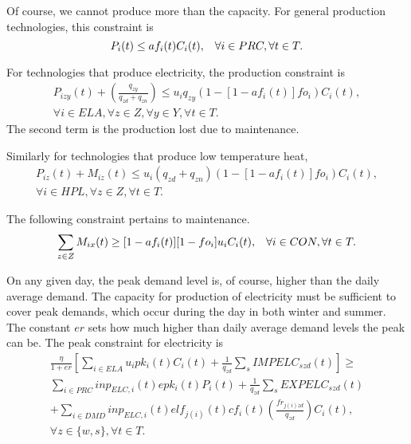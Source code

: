 Of course, we cannot produce more than the capacity.  For general production technologies, this constraint is
\begin{equation*}
P_i(t) \leq af_i(t)C_i(t), \hspace{3mm} \forall i \in PRC, \forall t \in T.
\end{equation*}

For technologies that produce electricity, the production constraint is
\begin{multline*}
P_{izy}(t) + \left(\frac{q_{zy}}{q_{zd} + q_{zn}}\right) \leq u_i q_{zy}\left( 1- \left[1- af_i(t)\right]fo_i\right)C_i(t),\\
\forall i \in ELA, \forall z \in Z, \forall y\in Y, \forall t \in T.
\end{multline*}
The second term is the production lost due to maintenance.

Similarly for technologies that produce low temperature heat,
\begin{multline}
\label{ENV:lthproduction}
P_{iz}(t) + M_{iz}(t) \leq u_i(q_{zd} + q_{zn})\left( 1- \left[1- af_i(t)\right]fo_i\right)C_i(t),\\
\forall i \in HPL, \forall z \in Z, \forall t \in T.
\end{multline}

The following constraint pertains to maintenance.
\begin{equation*}
\sum_{z\in Z} M_{ix}(t) \geq [1-af_i(t)][1-fo_i]u_i C_i(t), \hspace{3mm} \forall i \in CON, \forall t \in T.
\end{equation*}

On any given day, the peak demand level is, of course, higher than the daily average demand.  The capacity for production of electricity must be sufficient to cover peak demands, which occur during the day in both winter and summer.  The constant $er$ sets how much higher than daily average demand levels the peak can be.  The peak constraint for electricity is
\begin{multline*}
\frac{\eta}{1 + er}\left[ \sum_{i\in ELA} u_i pk_i(t) C_i(t) + \frac{1}{q_{zd}} \sum_s IMPELC_{szd}(t)\right] \geq \\
\sum_{i\in PRC} inp_{ELC,i}(t) epk_i(t) P_i(t) + \frac{1}{q_{zd}} \sum_s EXPELC_{szd}(t)\\
+ \sum_{i\in DMD}  inp_{ELC,i}(t) elf_{j(i)}(t) cf_i(t) \left( \frac{fr_{j(i)zd}}{q_{zd}}\right) C_i(t),\\
\forall z\in \{w,s\}, \forall t\in T.
\end{multline*}

